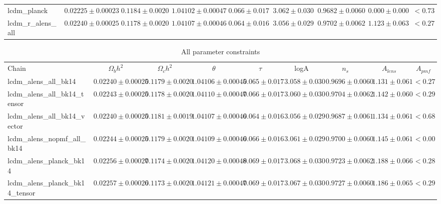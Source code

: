 \documentclass[preprint]{emulateapj}
\begin{document}
\begin{table*}[h]
\begin{center}
\begin{tabular}{l || c c c c c c c | c}
lcdm\_planck & $ 0.02225\pm  0.00023$ & $ 0.1184\pm  0.0020$ & $ 1.04102\pm  0.00047$ & $ 0.066\pm  0.017$ & $ 3.062\pm  0.030$ & $ 0.9682\pm  0.0060$ & $ 0.000 \pm  0.000$ & $< 0.73$ \\
lcdm\_r\_alens\_all & $ 0.02240\pm  0.00025$ & $ 0.1178\pm  0.0020$ & $ 1.04107\pm  0.00046$ & $ 0.064\pm  0.016$ & $ 3.056\pm  0.029$ & $ 0.9702\pm  0.0062$ & $ 1.123 \pm  0.063$ & $< 0.27$ \\
\end{tabular}
 \normalsize
\end{center}
\end{table*}


\begin{table*}[h]
\begin{center}
\caption{\label{tab:param_all} All parameter constraints}
\tiny
\begin{tabular}{l || c c c c c c c | c}
Chain & $\Omega_b h^2$  & $\Omega_c h^2$  & $\theta$  & $\tau$  & logA  & $n_s$  & $A_{lens}$  & $A_{pmf}$ \\
lcdm\_alens\_all\_bk14 & $ 0.02240\pm  0.00025$ & $ 0.1179\pm  0.0020$ & $ 1.04106\pm  0.00045$ & $ 0.065\pm  0.017$ & $ 3.058\pm  0.030$ & $ 0.9696\pm  0.0060$ & $ 1.131 \pm  0.061$ & $< 0.27$ \\
lcdm\_alens\_all\_bk14\_tensor & $ 0.02243\pm  0.00025$ & $ 0.1178\pm  0.0020$ & $ 1.04110\pm  0.00047$ & $ 0.066\pm  0.017$ & $ 3.060\pm  0.030$ & $ 0.9704\pm  0.0062$ & $ 1.142 \pm  0.060$ & $< 0.29$ \\
lcdm\_alens\_all\_bk14\_vector & $ 0.02240\pm  0.00025$ & $ 0.1181\pm  0.0019$ & $ 1.04107\pm  0.00046$ & $ 0.064\pm  0.016$ & $ 3.056\pm  0.029$ & $ 0.9687\pm  0.0061$ & $ 1.134 \pm  0.061$ & $< 0.68$ \\
lcdm\_alens\_nopmf\_all\_bk14 & $ 0.02244\pm  0.00025$ & $ 0.1179\pm  0.0020$ & $ 1.04109\pm  0.00046$ & $ 0.066\pm  0.016$ & $ 3.061\pm  0.029$ & $ 0.9700\pm  0.0060$ & $ 1.145 \pm  0.061$ & $< 0.00$ \\
lcdm\_alens\_planck\_bk14 & $ 0.02256\pm  0.00027$ & $ 0.1174\pm  0.0020$ & $ 1.04120\pm  0.00048$ & $ 0.069\pm  0.017$ & $ 3.068\pm  0.030$ & $ 0.9723\pm  0.0062$ & $ 1.188 \pm  0.066$ & $< 0.28$ \\
lcdm\_alens\_planck\_bk14\_tensor & $ 0.02257\pm  0.00026$ & $ 0.1173\pm  0.0020$ & $ 1.04121\pm  0.00047$ & $ 0.069\pm  0.017$ & $ 3.067\pm  0.030$ & $ 0.9727\pm  0.0060$ & $ 1.186 \pm  0.065$ & $< 0.29$ \\

\end{tabular}
\end{center}
\end{table*}
\end{document}
